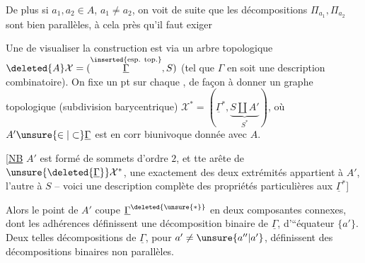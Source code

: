 
De plus si $a_1,a_2\in A$, $a_1\ne a_2$, on voit de suite que les décompositions $\Pi_{a_1},\Pi_{a_2}$ sont bien parallèles, à cela près qu'il faut exiger %

Une  de visualiser la construction est via un arbre topologique $\deleted{A}\mathcal{X}=(\overset{\text{\inserted{esp. top.}}}{\underline{\Gamma}},S)$ (tel que $\Gamma$ en soit une description combinatoire). On fixe un pt sur chaque , de façon à donner un graphe topologique (subdivision barycentrique) $\mathcal{X}^{\ast}=(\underline{\Gamma}^{\ast},\underbrace{S\amalg A'}_{S^{\ast}})$, où $A'\unsure{\in|\subset}\underline{\Gamma}$ est en corr biunivoque donnée avec  $A$.

 [\uline{NB} $A'$ est formé de  sommets d'ordre $2$, et  tte arête de $\unsure{\deleted{\underline{\Gamma}}}\mathcal{X}^{\ast}$, une exactement des deux extrémités appartient à $A'$, l'autre à $S$ -- voici une description complète des propriétés particulières aux $\underline{\Gamma}^{\ast}$]

Alors le point  de $A'$ coupe $\underline{\Gamma}^{\deleted{\unsure{\ast}}}$ en deux composantes connexes, dont les adhérences définissent une décomposition binaire de $\underline{\Gamma}$, d'``équateur $\{a'\}$. Deux telles décompositions  de $\underline{\Gamma}$, pour $a'\ne\unsure{a''|a'}$, définissent des décompositions binaires  non parallèles.

